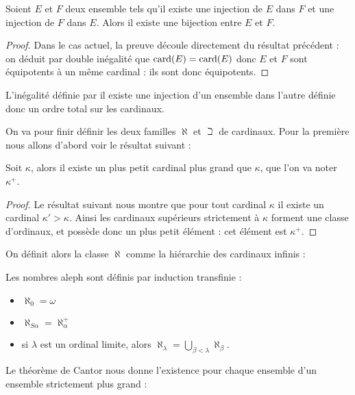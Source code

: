\begin{them}
    Soient $E$ et $F$ deux ensemble tels qu'il existe une injection de $E$ dans $F$ et une injection de $F$ dans $E$. Alors il existe une bijection entre $E$ et $F$.
\end{them}

\begin{proof}
    Dans le cas actuel, la preuve découle directement du résultat précédent : on déduit par double inégalité que $\mathrm{card}(E) = \mathrm{card}(E)$ donc $E$ et $F$ sont équipotents à un même cardinal : ils sont donc équipotents.
\end{proof}

L'inégalité définie par \og il existe une injection d'un ensemble dans l'autre\fg{} définie donc un ordre total sur les cardinaux.

On va pour finir définir les deux familles $\aleph$ et $\beth$ de cardinaux. Pour la première nous allons d'abord voir le résultat suivant :

\begin{prop}
    Soit $\kappa$, alors il existe un plus petit cardinal plus grand que $\kappa$, que l'on va noter $\kappa^+$.
\end{prop}

\begin{proof}
    Le résultat suivant nous montre que pour tout cardinal $\kappa$ il existe un cardinal $\kappa' > \kappa$. Ainsi les cardinaux supérieurs strictement à $\kappa$ forment une classe d'ordinaux, et possède donc un plus petit élément : cet élément est $\kappa^+$.
\end{proof}

On définit alors la classe $\aleph$ comme la hiérarchie des cardinaux infinis :

\begin{defi}[Aleph]
    Les nombres aleph sont définis par induction transfinie :
    \begin{itemize}[label=$\bullet$]
        \item $\aleph_0 = \omega$
        \item $\aleph_{S\alpha} = \aleph_\alpha^+$
        \item si $\lambda$ est un ordinal limite, alors $\aleph_\lambda = \bigcup_{\beta < \lambda} \aleph_\beta$.
    \end{itemize}
\end{defi}

Le théorème de Cantor nous donne l'existence pour chaque ensemble d'un ensemble strictement plus grand :

